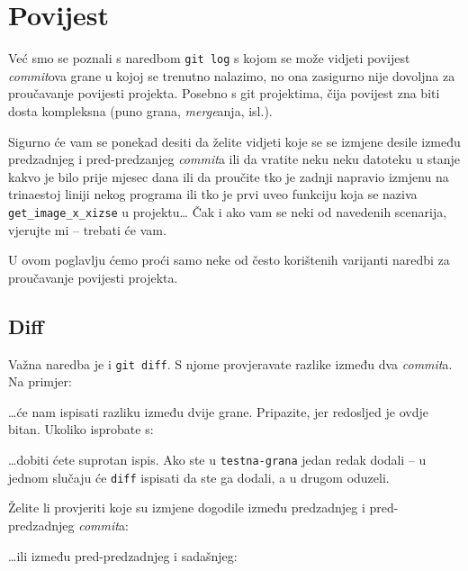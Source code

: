 \chapter*{Povijest}

Već smo se poznali s naredbom \verb+git log+ s kojom se može vidjeti povijest \emph{commit}ova grane u kojoj se trenutno nalazimo, no ona zasigurno nije dovoljna za proučavanje povijesti projekta.
Posebno s git projektima, čija povijest zna biti dosta kompleksna (puno grana, \emph{merge}anja, isl.).

Sigurno će vam se ponekad desiti da želite vidjeti koje se se izmjene desile između predzadnjeg i pred-predzanjeg \emph{commit}a ili da vratite neku neku datoteku u stanje kakvo je bilo prije mjesec dana ili da proučite tko je zadnji napravio izmjenu na trinaestoj liniji nekog programa ili tko je prvi uveo funkciju koja se naziva \verb+get_image_x_xizse+ u projektu\dots 
Čak i ako vam se neki od navedenih scenarija, vjerujte mi -- trebati će vam.

U ovom poglavlju ćemo proći samo neke od često korištenih varijanti naredbi za proučavanje povijesti projekta.

\section*{Diff}

Važna naredba je i \verb+git diff+. 
S njome provjeravate razlike između dva \emph{commit}a.
Na primjer:


\dots{}će nam ispisati razliku između dvije grane. Pripazite, jer redosljed je ovdje bitan.
Ukoliko isprobate s:


\dots{}dobiti ćete suprotan ispis. 
Ako ste u \verb+testna-grana+ jedan redak dodali -- u jednom slučaju će \verb+diff+ ispisati da ste ga dodali, a u drugom oduzeli.

Želite li provjeriti koje su izmjene dogodile između predzadnjeg i pred-predzadnjeg \emph{commit}a:


\dots{}ili između pred-predzadnjeg i sadašnjeg:


